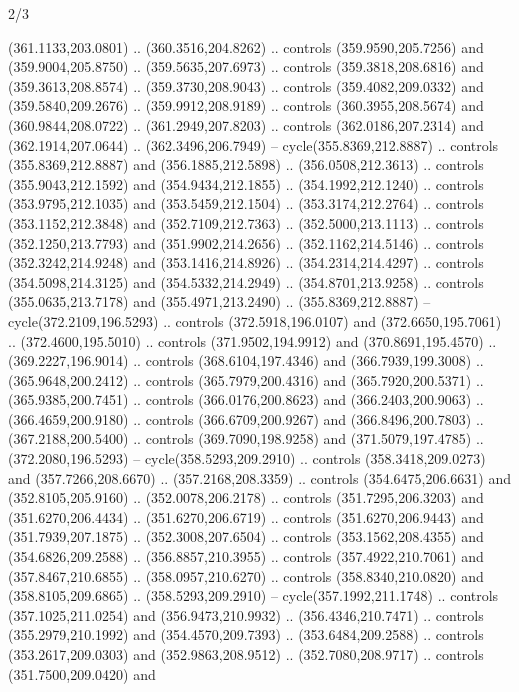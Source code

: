 \begin{flagdescription}{2/3}
\begin{scope}[xshift=0.5\flaglength,yshift=0.5\flagwidth,scale=\flagwidth/495.65]
\begin{scope}[y=0.8pt, x=0.8pt, yscale=-1,shift={(-463.76,-309.78)}]
  (361.1133,203.0801) .. (360.3516,204.8262) .. controls (359.9590,205.7256) and
  (359.9004,205.8750) .. (359.5635,207.6973) .. controls (359.3818,208.6816) and
  (359.3613,208.8574) .. (359.3730,208.9043) .. controls (359.4082,209.0332) and
  (359.5840,209.2676) .. (359.9912,208.9189) .. controls (360.3955,208.5674) and
  (360.9844,208.0722) .. (361.2949,207.8203) .. controls (362.0186,207.2314) and
  (362.1914,207.0644) .. (362.3496,206.7949) -- cycle(355.8369,212.8887) ..
  controls (355.8369,212.8887) and (356.1885,212.5898) .. (356.0508,212.3613) ..
  controls (355.9043,212.1592) and (354.9434,212.1855) .. (354.1992,212.1240) ..
  controls (353.9795,212.1035) and (353.5459,212.1504) .. (353.3174,212.2764) ..
  controls (353.1152,212.3848) and (352.7109,212.7363) .. (352.5000,213.1113) ..
  controls (352.1250,213.7793) and (351.9902,214.2656) .. (352.1162,214.5146) ..
  controls (352.3242,214.9248) and (353.1416,214.8926) .. (354.2314,214.4297) ..
  controls (354.5098,214.3125) and (354.5332,214.2949) .. (354.8701,213.9258) ..
  controls (355.0635,213.7178) and (355.4971,213.2490) .. (355.8369,212.8887) --
  cycle(372.2109,196.5293) .. controls (372.5918,196.0107) and
  (372.6650,195.7061) .. (372.4600,195.5010) .. controls (371.9502,194.9912) and
  (370.8691,195.4570) .. (369.2227,196.9014) .. controls (368.6104,197.4346) and
  (366.7939,199.3008) .. (365.9648,200.2412) .. controls (365.7979,200.4316) and
  (365.7920,200.5371) .. (365.9385,200.7451) .. controls (366.0176,200.8623) and
  (366.2403,200.9063) .. (366.4659,200.9180) .. controls (366.6709,200.9267) and
  (366.8496,200.7803) .. (367.2188,200.5400) .. controls (369.7090,198.9258) and
  (371.5079,197.4785) .. (372.2080,196.5293) -- cycle(358.5293,209.2910) ..
  controls (358.3418,209.0273) and (357.7266,208.6670) .. (357.2168,208.3359) ..
  controls (354.6475,206.6631) and (352.8105,205.9160) .. (352.0078,206.2178) ..
  controls (351.7295,206.3203) and (351.6270,206.4434) .. (351.6270,206.6719) ..
  controls (351.6270,206.9443) and (351.7939,207.1875) .. (352.3008,207.6504) ..
  controls (353.1562,208.4355) and (354.6826,209.2588) .. (356.8857,210.3955) ..
  controls (357.4922,210.7061) and (357.8467,210.6855) .. (358.0957,210.6270) ..
  controls (358.8340,210.0820) and (358.8105,209.6865) .. (358.5293,209.2910) --
  cycle(357.1992,211.1748) .. controls (357.1025,211.0254) and
  (356.9473,210.9932) .. (356.4346,210.7471) .. controls (355.2979,210.1992) and
  (354.4570,209.7393) .. (353.6484,209.2588) .. controls (353.2617,209.0303) and
  (352.9863,208.9512) .. (352.7080,208.9717) .. controls (351.7500,209.0420) and

\end{scope}
\end{scope}
\end{flagdescription}

